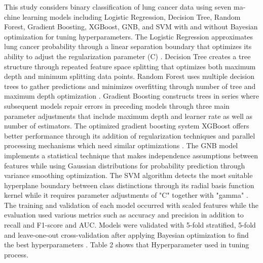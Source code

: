 \documentclass[runningheads]{llncs}
\begin{document}
This study considers binary classification of lung cancer data using seven ma-chine learning models including Logistic Regression, Decision Tree, Random Forest, Gradient Boosting, XGBoost, GNB, and SVM with and without Bayesian optimization for tuning hyperparameters. The Logistic Regression approximates lung cancer probability through a linear separation boundary that optimizes its ability to adjust the regularization parameter (C) \cite{wani2024}. Decision Tree creates a tree structure through repeated feature space splitting that optimizes both maximum depth and minimum splitting data points. Random Forest uses multiple decision trees to gather predictions and minimizes overfitting through number of tree and maximum depth optimization \cite{falana2024}. Gradient Boosting constructs trees in series where subsequent models repair errors in preceding models through three main parameter adjustments that include maximum depth and learner rate as well as number of estimators. The optimized gradient boosting system XGBoost offers better performance through its addition of regularization techniques and parallel processing mechanisms which need similar optimizations \cite{miller2024,parker2024}. The GNB model implements a statistical technique that makes independence assumptions between features while using Gaussian distributions for probability prediction through variance smoothing optimization. The SVM algorithm detects the most suitable hyperplane boundary between class distinctions through its radial basis function kernel while it requires parameter adjustments of "C" together with "gamma" \cite{zamzam2024}. The training and validation of each model occurred with scaled features while the evaluation used various metrics such as accuracy and precision in addition to recall and F1-score and AUC. Models were validated with 5-fold stratified, 5-fold and leave-one-out cross-validation after applying Bayesian optimization to find the best hyperparameters \cite{g2020}. Table 2 shows that Hyperparameter used in tuning process.
\end{document}
